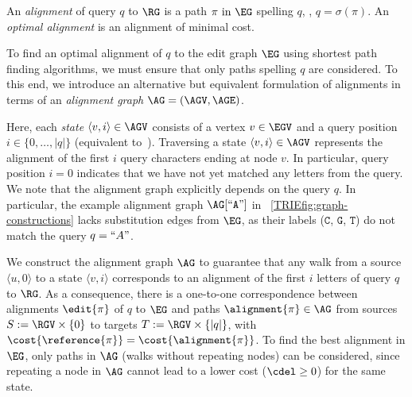 An \emph{alignment} of query $q$ to $\RG$ is a path $\pi \text{ in } \EG$
spelling $q$, \ie, $q=\sigma(\pi)$. An \emph{optimal alignment} is an alignment
of minimal cost.

To find an optimal alignment of $q$ to the edit graph $\EG$ using shortest path
finding algorithms, we must ensure that only paths spelling $q$ are considered.
To this end, we introduce an alternative but equivalent formulation of
alignments in terms of an \emph{alignment graph} $\AG=(\AGV,\AGE)$.

Here, each \emph{state} $\langle v,i \rangle \in \AGV$ consists of a vertex $v \in
\EGV$ and a query position $i \in \{0,\dots,|q|\}$ (equivalent
to~\cite{rautiainen_aligning_2017}). Traversing a state $\langle v,i \rangle \in
\AGV$ represents the alignment of the first $i$ query characters ending at node $v$.
%
In particular, query position $i=0$ indicates that we have not yet matched any
letters from the query.
%
We note that the alignment graph explicitly depends on the query $q$. In
particular, the example alignment graph $\AG[``\texttt{A}"]$ in
~\cref{TRIEfig:graph-constructions} lacks substitution edges from $\EG$, as their
labels ($\texttt{C}$, $\texttt{G}$, $\texttt{T}$) do not match the query
$q=``A"$.

We construct the alignment graph $\AG$ to guarantee that any walk from a source
$\langle u,0 \rangle$ to a state $\langle v,i \rangle$ corresponds to an
alignment of the first $i$ letters of query $q$ to $\RG$. As a consequence,
there is a one-to-one correspondence between alignments $\edit{\pi}$ of $q$ to
$\EG$ and paths $\alignment{\pi} \in \AG$ from sources $S:=\RGV \times \{0\}$ to
targets $T:=\RGV \times \{|q|\}$, with
$\cost{\reference{\pi}}=\cost{\alignment{\pi}}$. To find the best alignment in
$\EG$, only paths in $\AG$ (walks without repeating nodes) can be considered,
since repeating a node in $\AG$ cannot lead to a lower cost ($\cdel \geq 0$) for
the same state.

